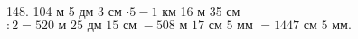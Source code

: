 148. 104 м 5 дм 3 см $\cdot 5-1$ км 16 м 35 см$:2=520\text{ м }25\text{ дм }15\text{ см }-508\text{ м }17\text{ см }5\text{ мм }=1447\text{ см }5\text{ мм}.$\\

